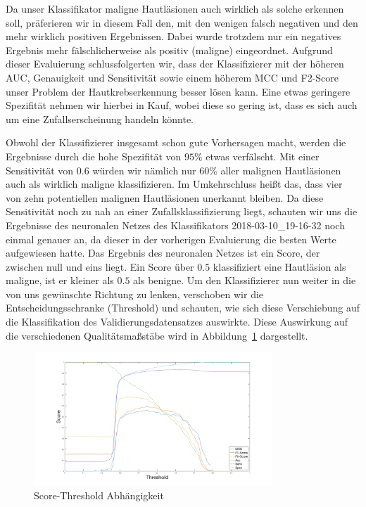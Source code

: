 Da unser Klassifikator maligne Hautläsionen auch wirklich als solche erkennen soll, präferieren wir in diesem Fall den, mit den wenigen falsch negativen und den mehr wirklich positiven Ergebnissen. Dabei wurde trotzdem nur ein negatives Ergebnis mehr fälschlicherweise als positiv (maligne) eingeordnet. Aufgrund dieser Evaluierung schlussfolgerten wir, dass der Klassifizierer mit der höheren AUC, Genauigkeit und Sensitivität sowie einem  höherem MCC und F2-Score unser Problem der Hautkrebserkennung besser lösen kann. Eine etwas geringere Spezifität nehmen wir hierbei in Kauf, wobei diese so gering ist, dass es sich auch um eine Zufallserscheinung handeln könnte.
 
Obwohl der Klassifizierer insgesamt schon gute Vorhersagen macht, werden die Ergebnisse durch die hohe Spezifität von $95\%$ etwas verfälscht. Mit einer Sensitivität von $0.6$ würden wir nämlich nur $60\%$ aller malignen Hautläsionen auch als wirklich maligne klassifizieren. Im Umkehrschluss heißt das, dass vier von zehn potentiellen malignen Hautläsionen unerkannt bleiben. Da diese Sensitivität noch zu nah an einer Zufallsklassifizierung liegt, schauten wir uns die Ergebnisse des neuronalen Netzes des Klassifikators 2018-03-10\_19-16-32 noch einmal genauer an, da dieser in der vorherigen Evaluierung die besten Werte aufgewiesen hatte. Das Ergebnis des neuronalen Netzes ist ein Score, der zwischen null und eins liegt. Ein Score über $0.5$ klassifiziert eine Hautläsion als maligne, ist er kleiner als $0.5$ als benigne. Um den Klassifizierer nun weiter in die von uns gewünschte Richtung zu lenken, verschoben wir die Entscheidungsschranke (Threshold) und schauten, wie sich diese Verschiebung auf die Klassifikation des Validierungsdatensatzes auswirkte. Diese Auswirkung auf die verschiedenen Qualitätsmaßstäbe wird in Abbildung~\ref{fig:threshold} dargestellt. 

\begin{figure}[htb!]
	\begin{center}
		\includegraphics[width=0.8\textwidth]{pics/evaluation/treshold.png}
		\caption{Score-Threshold Abhängigkeit}
		\label{fig:threshold}
    \end{center}
\end{figure}

